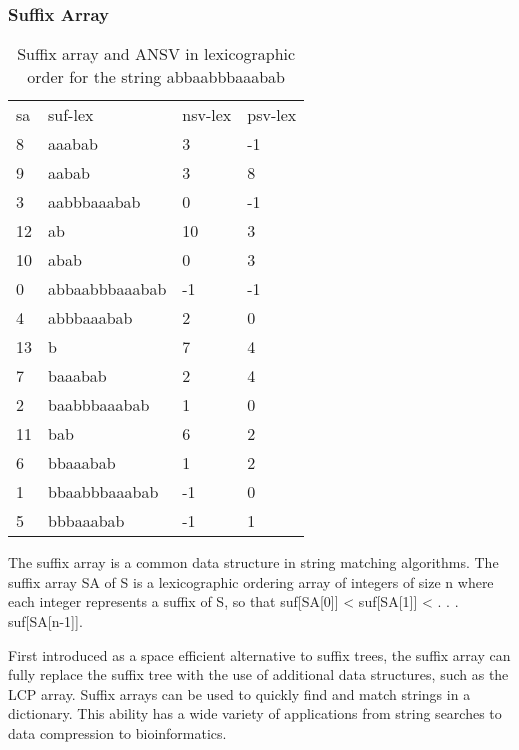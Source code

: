 \subsubsection{Suffix Array}

\begin{table}[ht!]
\centering
\begin{tabular}{llll}
sa & suf-lex        & nsv-lex & psv-lex \\
8  & aaabab         & 3       & -1      \\
9  & aabab          & 3       & 8       \\
3  & aabbbaaabab    & 0       & -1      \\
12 & ab             & 10      & 3       \\
10 & abab           & 0       & 3       \\
0  & abbaabbbaaabab & -1      & -1      \\
4  & abbbaaabab     & 2       & 0       \\
13 & b              & 7       & 4       \\
7  & baaabab        & 2       & 4       \\
2  & baabbbaaabab   & 1       & 0       \\
11 & bab            & 6       & 2       \\
6  & bbaaabab       & 1       & 2       \\
1  & bbaabbbaaabab  & -1      & 0       \\
5  & bbbaaabab      & -1      & 1      
\end{tabular}
\caption{Suffix array and ANSV in lexicographic order for the string abbaabbbaaabab}
\label{table:sa}
\end{table}

The suffix array is a common data structure in string matching algorithms.
The suffix array SA of S is a lexicographic ordering array of integers of size n where each integer represents a suffix of S, so that suf[SA[0]] < suf[SA[1]] < . . . suf[SA[n-1]].

First introduced as a space efficient alternative to suffix trees, the suffix array can fully replace the suffix tree with the use of additional data structures, such as the LCP array.
Suffix arrays can be used to quickly find and match strings in a dictionary.
This ability has a wide variety of applications from string searches to data compression to bioinformatics.

